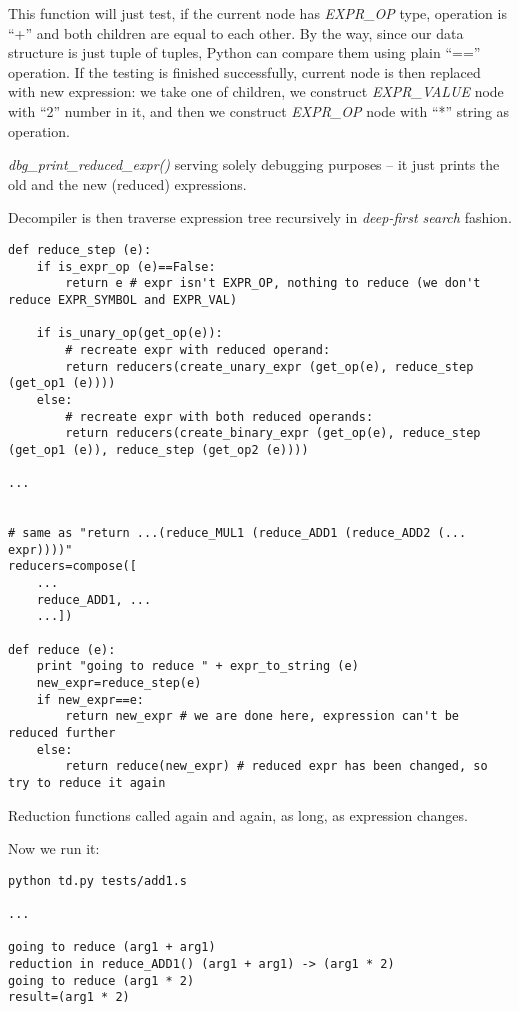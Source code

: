 ﻿\documentclass[12pt]{article}
\begin{document}
This function will just test, if the current node has \textit{EXPR\_OP} type,
operation is ``+'' and both children are equal to each other.
By the way, since our data structure is just tuple of tuples, Python can compare them using plain ``=='' operation.
If the testing is finished successfully, current node is then replaced with new expression:
we take one of children, we construct \textit{EXPR\_VALUE} node with ``2'' number in it,
and then we construct \textit{EXPR\_OP} node with ``*'' string as operation.

\textit{dbg\_print\_reduced\_expr()} serving solely debugging purposes --
it just prints the old and the new (reduced) expressions.

Decompiler is then traverse expression tree recursively in \textit{deep-first search} fashion.

\begin{lstlisting}
def reduce_step (e):
    if is_expr_op (e)==False:
        return e # expr isn't EXPR_OP, nothing to reduce (we don't reduce EXPR_SYMBOL and EXPR_VAL)

    if is_unary_op(get_op(e)):
        # recreate expr with reduced operand:
        return reducers(create_unary_expr (get_op(e), reduce_step (get_op1 (e))))
    else:
        # recreate expr with both reduced operands:
        return reducers(create_binary_expr (get_op(e), reduce_step (get_op1 (e)), reduce_step (get_op2 (e))))

...


# same as "return ...(reduce_MUL1 (reduce_ADD1 (reduce_ADD2 (... expr))))"
reducers=compose([
	...
    reduce_ADD1, ...
    ...])

def reduce (e):
    print "going to reduce " + expr_to_string (e)
    new_expr=reduce_step(e)
    if new_expr==e:
        return new_expr # we are done here, expression can't be reduced further
    else:
        return reduce(new_expr) # reduced expr has been changed, so try to reduce it again
\end{lstlisting}

Reduction functions called again and again, as long, as expression changes.

Now we run it:

\begin{lstlisting}
python td.py tests/add1.s

...

going to reduce (arg1 + arg1)
reduction in reduce_ADD1() (arg1 + arg1) -> (arg1 * 2)
going to reduce (arg1 * 2)
result=(arg1 * 2)
\end{lstlisting}
\end{document}
